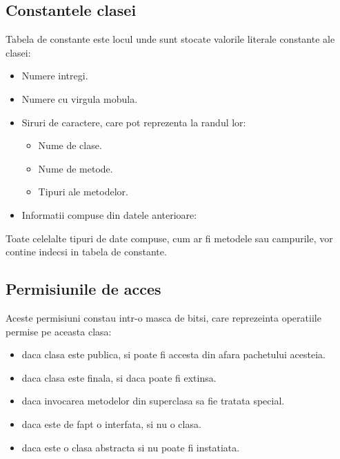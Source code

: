 \subsection{Constantele clasei}

Tabela de constante este locul unde sunt stocate valorile literale
constante ale clasei:

\begin{itemize}
    \item Numere intregi.
    \item Numere cu virgula mobula.
    \item Siruri de caractere, care pot reprezenta la randul lor:
        \begin{itemize}
            \item Nume de clase.
            \item Nume de metode.
            \item Tipuri ale metodelor.
        \end{itemize}
    \item Informatii compuse din datele anterioare:
        \begin{itemize]}
            \item Referinta la o metoda a unei clase.
            \item Referinta la o constanta a unei clase.
        \end{itemize]}
\end{itemize}

Toate celelalte tipuri de date compuse, cum ar fi metodele sau
campurile, vor contine indecsi in tabela de constante.

\subsection{Permisiunile de acces}

Aceste permisiuni constau intr-o masca de bitsi, care reprezeinta
operatiile permise pe aceasta clasa:

\begin{itemize}
    \item daca clasa este publica, si poate fi accesta din afara pachetului acesteia.
    \item daca clasa este finala, si daca poate fi extinsa.
    \item daca invocarea metodelor din superclasa sa fie tratata special.
    \item daca este de fapt o interfata, si nu o clasa.
    \item daca este o clasa abstracta si nu poate fi instatiata.
\end{itemize}

